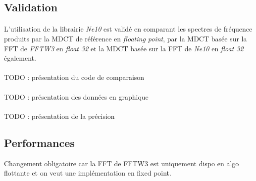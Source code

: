 \documentclass{article}
\begin{document}
    \subsection{Validation}
    \paragraph{}
    L'utilisation de la librairie \emph{Ne10} est validé en comparant les spectres de fréquence produits par la MDCT de référence en \emph{floating point}, par la MDCT basée sur la FFT de \emph{FFTW3} en \emph{float 32} et la MDCT basée sur la FFT de \emph{Ne10} en \emph{float 32} également.

    \paragraph{}
    TODO : présentation du code de comparaison

    \paragraph{}
    TODO : présentation des données en graphique

    \paragraph{}
    TODO : présentation de la précision



    \paragraph{}

    \subsection{Performances}



    Changement obligatoire car la FFT de FFTW3 est uniquement dispo en algo flottante et on veut une implémentation en fixed point.

     
\end{document}
